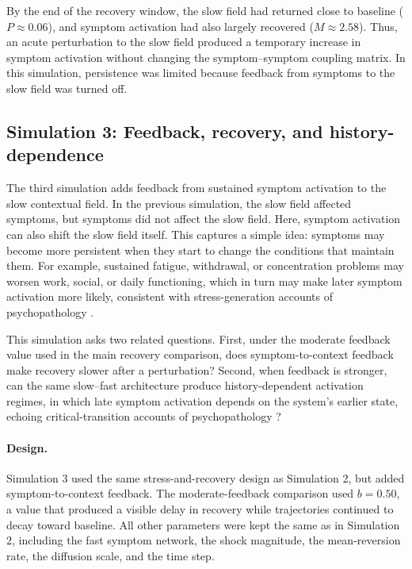 \documentclass[man,12pt,floatsintext]{apa7}
\begin{document}
By the end of the recovery window, the slow field had returned close to
baseline (\(P\approx 0.06\)), and symptom activation had also largely recovered
(\(M\approx 2.58\)). Thus, an acute perturbation to the slow field produced a
temporary increase in symptom activation without changing the symptom--symptom
coupling matrix. In this simulation, persistence was limited because feedback
from symptoms to the slow field was turned off.

\subsection{Simulation 3: Feedback, recovery, and history-dependence}
The third simulation adds feedback from sustained symptom activation to the
slow contextual field. In the previous simulation, the slow field affected
symptoms, but symptoms did not affect the slow field. Here, symptom activation
can also shift the slow field itself. This captures a simple idea: symptoms may
become more persistent when they start to change the conditions that maintain
them. For example, sustained fatigue, withdrawal, or concentration problems may
worsen work, social, or daily functioning, which in turn may make later symptom
activation more likely, consistent with stress-generation accounts of psychopathology \parencite{hammen2006stress, liu2010stress, rnic2023vicious}.

This simulation asks two related questions. First, under the moderate feedback
value used in the main recovery comparison, does symptom-to-context feedback
make recovery slower after a perturbation? Second, when feedback is stronger,
can the same slow--fast architecture produce history-dependent activation
regimes, in which late symptom activation depends on the system's earlier
state, echoing critical-transition accounts of psychopathology \parencite{van2014critical, scheffer2009early, helmich2021early}?

\paragraph{Design.}
Simulation 3 used the same stress-and-recovery design as Simulation 2, but
added symptom-to-context feedback. The moderate-feedback comparison used
\(b=0.50\), a value that produced a visible delay in recovery while trajectories
continued to decay toward baseline. All other parameters were kept the same as
in Simulation 2, including the fast symptom network, the shock magnitude, the
mean-reversion rate, the diffusion scale, and the time step.
\end{document}
